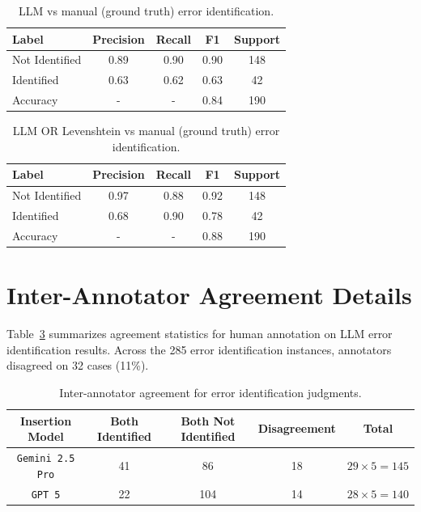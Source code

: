 \documentclass{article}
\newcommand{\gemini}{\texttt{Gemini 2.5 Pro}}
\newcommand{\gpt}{\texttt{GPT 5}}
\begin{document}
\begin{appendix}
\begin{table}[th!]
\centering
\begin{tabular}{lcccc}
\hline
Label & Precision & Recall & F1 & Support \\
\hline
Not Identified & 0.89 & 0.90 & 0.90 & 148 \\
Identified & 0.63 & 0.62 & 0.63 & 42 \\
\hline
Accuracy & - & - & 0.84 & 190 \\
\hline
\end{tabular}
\caption{LLM vs manual (ground truth) error identification. }
\label{table:llm_evaluation_matrix}
\end{table}

\begin{table}[th!]
\centering
\begin{tabular}{lcccc}
\hline
Label & Precision & Recall & F1 & Support \\
\hline
Not Identified & 0.97 & 0.88 & 0.92 & 148 \\
Identified & 0.68 & 0.90 & 0.78 & 42 \\
\hline
Accuracy & - & - & 0.88 & 190 \\
\hline
\end{tabular}
\caption{LLM OR Levenshtein vs manual (ground truth) error identification. }
\label{table:llm_or_leven_eval_matrix}
\end{table}

\section{Inter-Annotator Agreement Details} 
\label{appendix:inter_annotator_agreement}

Table~\ref{table:inter_annotator} summarizes agreement statistics for human annotation on LLM error identification results. Across the 285 error identification instances, annotators disagreed on 32 cases (11\%). 
\begin{table}[th!]
    \centering
    \begin{tabular}{|c|c|c|c|c|}
    \hline
    \textbf{Insertion Model} & \textbf{Both Identified} & \textbf{Both Not Identified} & \textbf{Disagreement} & \textbf{Total} \\
    \hline
    \gemini{} & 41 & 86 & 18 & $29 \times 5 = 145$ \\
    \gpt{} & 22 & 104 & 14 & $28 \times 5 = 140$ \\
    \hline
    \end{tabular}
    \caption{Inter-annotator agreement for error identification judgments.}
    \label{table:inter_annotator}
\end{table}


\end{appendix}
\end{document}
